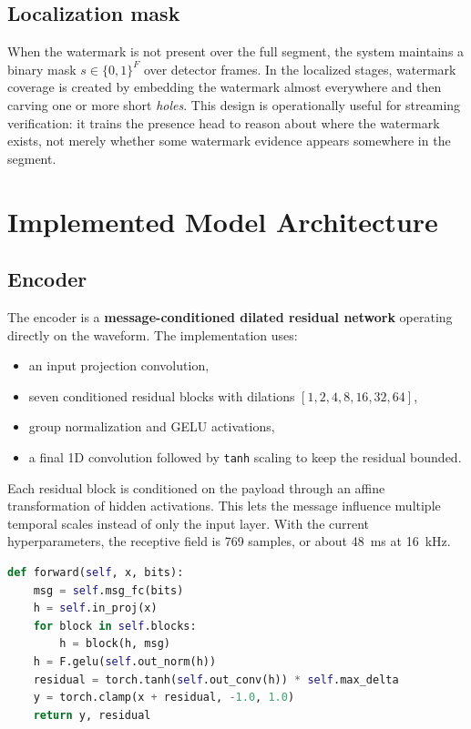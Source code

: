 \subsection{Localization mask}
When the watermark is not present over the full segment, the system maintains a binary mask $s \in \{0,1\}^{F}$ over detector frames. In the localized stages, watermark coverage is created by embedding the watermark almost everywhere and then carving one or more short \emph{holes}. This design is operationally useful for streaming verification: it trains the presence head to reason about where the watermark exists, not merely whether some watermark evidence appears somewhere in the segment.

\section{Implemented Model Architecture}
\subsection{Encoder}
The encoder is a \textbf{message-conditioned dilated residual network} operating directly on the waveform. The implementation uses:
\begin{itemize}[leftmargin=1.25em]
  \item an input projection convolution,
  \item seven conditioned residual blocks with dilations $[1,2,4,8,16,32,64]$,
  \item group normalization and GELU activations,
  \item a final 1D convolution followed by \texttt{tanh} scaling to keep the residual bounded.
\end{itemize}
Each residual block is conditioned on the payload through an affine transformation of hidden activations. This lets the message influence multiple temporal scales instead of only the input layer. With the current hyperparameters, the receptive field is 769 samples, or about 48~ms at 16~kHz.

\begin{lstlisting}[language=Python,caption={Simplified encoder forward pass from the implemented model.},label={lst:encoder_forward}]
def forward(self, x, bits):
    msg = self.msg_fc(bits)
    h = self.in_proj(x)
    for block in self.blocks:
        h = block(h, msg)
    h = F.gelu(self.out_norm(h))
    residual = torch.tanh(self.out_conv(h)) * self.max_delta
    y = torch.clamp(x + residual, -1.0, 1.0)
    return y, residual
\end{lstlisting}

